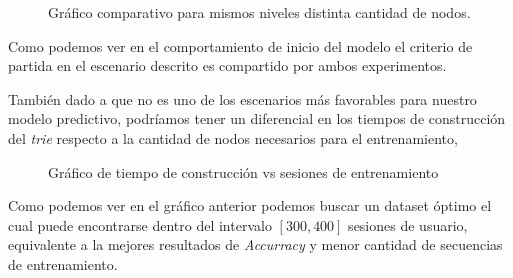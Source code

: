 	
	
	
	\begin{figure}[h] 
		\centering
		\caption{Gráfico comparativo para mismos niveles distinta cantidad de nodos.}
		\label{fig:sim}
	\end{figure}
	
	


	Como podemos ver en el comportamiento de inicio del modelo el criterio de partida en el escenario descrito es compartido por ambos experimentos.

	También dado a que no es uno de los escenarios más favorables para nuestro modelo predictivo, podríamos tener un diferencial en los tiempos de construcción del \emph{trie} respecto a la cantidad de nodos necesarios para el entrenamiento, 

	\begin{figure}[h] 
	\centering
		\caption{Gráfico de tiempo de construcción vs sesiones de entrenamiento}
	  \label{fig:sim}
	 \end{figure}	
	
	Como podemos ver en el gráfico anterior podemos buscar un dataset óptimo el cual puede encontrarse dentro del intervalo $ [ 300,400 ]$ sesiones de usuario, equivalente a la mejores resultados de \emph{Accurracy} y menor cantidad de secuencias de entrenamiento.